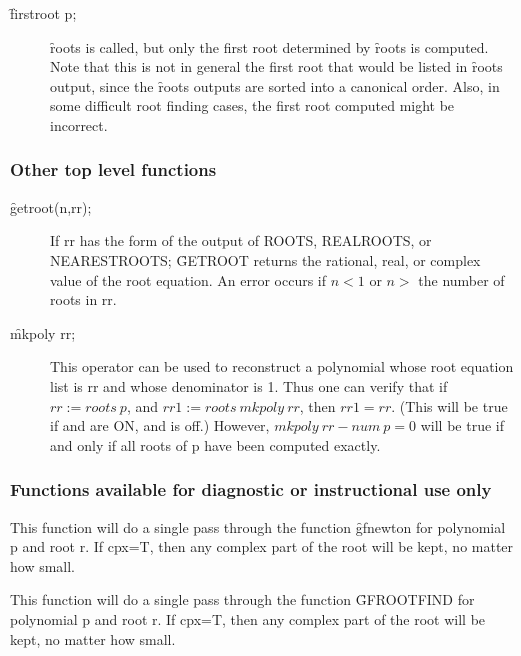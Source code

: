 \begin{description}
\item[\f{firstroot} p;]
  \hypertarget{operator:FIRSTROOT}{}
\f{roots} is called, but only the first root determined by
\f{roots} is computed.  Note that this is not in general the first root that
would be listed in \f{roots} output, since the \f{roots} outputs are sorted into
a canonical order.  Also, in some difficult root finding cases, the first
root computed might be incorrect.
\end{description}


\subsubsection{Other top level functions}

\begin{description}
\item[\f{getroot}(n,rr);]
     
\hypertarget{operator:GETROOT}{}  
If rr has the form of the output of ROOTS, REALROOTS,
or NEARESTROOTS; \f{GETROOT} returns the rational, real, or complex value of
the root equation.  An error occurs if $n<1$ or $n>$ the number of roots in
rr.

\item[\f{mkpoly} rr;]
  \hypertarget{operator:MKPOLY}{}
This operator can be used to reconstruct a polynomial
whose root equation list is rr and whose denominator is 1.  Thus one can
verify that if $rr := roots~p$, and $rr1 := roots~mkpoly~rr$, then
$rr1 = rr$. (This will be true if  and  are ON,
and  is off.)
However, $mkpoly~rr - num~p = 0$ will be true if and only if all roots of p
have been computed exactly.
\end{description}

\subsubsection{Functions available for diagnostic or instructional use only}
\hypertarget{operator:GFNEWT}{}
\hypertarget{operator:GFROOT}{}
\begin{description}
\item[\f{gfnewt}(p,r,cpx);] This function will do a single pass through the
function \f{gfnewton} for polynomial p and root r.  If cpx=T, then any
complex part of the root will be kept, no matter how small.

\item[\f{gfroot}(p,r,cpx);] This function will do a single pass through the
function \f{GFROOTFIND} for polynomial p and root r.  If cpx=T, then any
complex part of the root will be kept, no matter how small.
\end{description}

